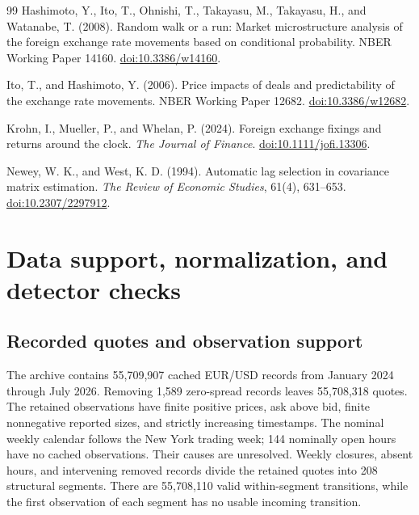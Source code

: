 \documentclass[12pt,letterpaper]{article}
\begin{document}
\begin{thebibliography}{99}
Hashimoto, Y., Ito, T., Ohnishi, T., Takayasu, M., Takayasu, H., and Watanabe, T. (2008).
Random walk or a run: Market microstructure analysis of the foreign exchange rate movements based on conditional probability.
NBER Working Paper 14160.
\href{https://doi.org/10.3386/w14160}{doi:10.3386/w14160}.

Ito, T., and Hashimoto, Y. (2006).
Price impacts of deals and predictability of the exchange rate movements.
NBER Working Paper 12682.
\href{https://doi.org/10.3386/w12682}{doi:10.3386/w12682}.

Krohn, I., Mueller, P., and Whelan, P. (2024).
Foreign exchange fixings and returns around the clock.
\emph{The Journal of Finance}.
\href{https://doi.org/10.1111/jofi.13306}{doi:10.1111/jofi.13306}.

Newey, W. K., and West, K. D. (1994).
Automatic lag selection in covariance matrix estimation.
\emph{The Review of Economic Studies}, 61(4), 631--653.
\href{https://doi.org/10.2307/2297912}{doi:10.2307/2297912}.
\end{thebibliography}

\endgroup
\clearpage
\onehalfspacing
\appendix
\section{Data support, normalization, and detector checks}
\label{app:data}

\subsection{Recorded quotes and observation support}
The archive contains 55,709,907 cached EUR/USD records from January 2024 through July 2026. Removing 1,589 zero-spread records leaves 55,708,318 quotes. The retained observations have finite positive prices, ask above bid, finite nonnegative reported sizes, and strictly increasing timestamps. The nominal weekly calendar follows the New York trading week; 144 nominally open hours have no cached observations. Their causes are unresolved. Weekly closures, absent hours, and intervening removed records divide the retained quotes into 208 structural segments. There are 55,708,110 valid within-segment transitions, while the first observation of each segment has no usable incoming transition.
\end{document}
